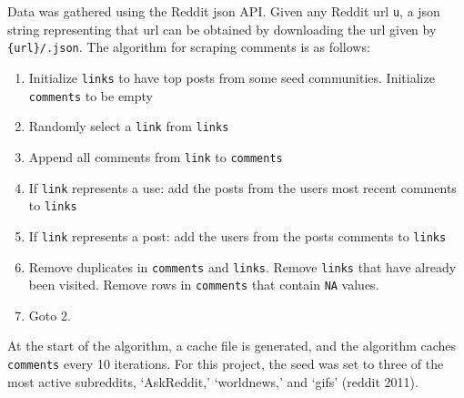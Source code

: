 \documentclass[
]{article}
\providecommand{\tightlist}{%
  \setlength{\itemsep}{0pt}\setlength{\parskip}{0pt}}
\begin{document}
Data was gathered using the Reddit json API. Given any Reddit url \texttt{u}, a json string representing that url can be obtained by downloading the url given by \texttt{\{url\}/.json}. The algorithm for scraping comments is as follows:

\begin{enumerate}
\def\labelenumi{\arabic{enumi}.}
\tightlist
\item
  Initialize \texttt{links} to have top posts from some seed communities. Initialize \texttt{comments} to be empty
\item
  Randomly select a \texttt{link} from \texttt{links}
\item
  Append all comments from \texttt{link} to \texttt{comments}
\item
  If \texttt{link} represents a use: add the posts from the users most recent comments to \texttt{links}
\item
  If \texttt{link} represents a post: add the users from the posts comments to \texttt{links}
\item
  Remove duplicates in \texttt{comments} and \texttt{links}. Remove \texttt{links} that have already been visited. Remove rows in \texttt{comments} that contain \texttt{NA} values.
\item
  Goto 2.
\end{enumerate}

At the start of the algorithm, a cache file is generated, and the algorithm caches \texttt{comments} every 10 iterations. For this project, the seed was set to three of the most active subreddits, `AskReddit,' `worldnews,' and `gifs' (reddit 2011).
\end{document}

